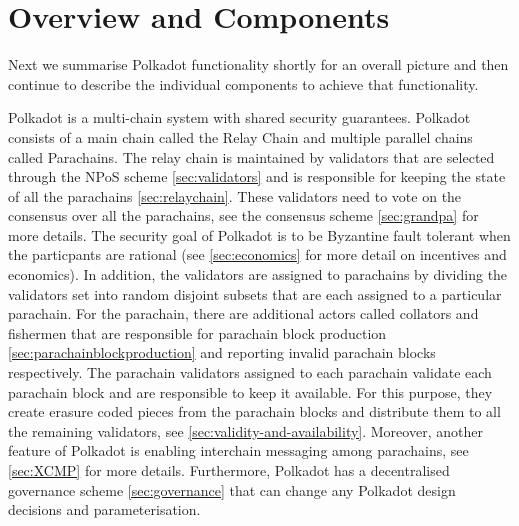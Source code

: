 \section{Overview and Components}\label{sec:components}
Next we summarise Polkadot functionality shortly for an overall picture and then continue to describe the individual components to achieve that functionality.

Polkadot is a multi-chain system with shared security guarantees. Polkadot consists of a main chain called the Relay Chain and multiple parallel chains
called Parachains. The relay chain is maintained by validators that are selected through the NPoS scheme \ref{sec:validators} and is responsible for keeping the state of all the parachains \ref{sec:relaychain}.
These validators need to vote on the consensus over all the parachains, see the consensus scheme \ref{sec:grandpa} for more details.
The security goal of Polkadot is to be Byzantine fault tolerant when the particpants are rational (see \ref{sec:economics} for more detail on incentives and economics).
In addition, the validators are assigned to parachains by dividing the validators set into random disjoint subsets that are each assigned to a particular parachain.
For the parachain, there are additional actors called collators and fishermen that are responsible for parachain block production \ref{sec:parachainblockproduction} and reporting invalid parachain blocks respectively.
The parachain validators assigned to each parachain validate each parachain block and are responsible to keep it available. For this purpose, they create erasure coded pieces from the parachain blocks and distribute
them to all the remaining validators, see \ref{sec:validity-and-availability}. Moreover, another feature of Polkadot is enabling interchain messaging among parachains, see \ref{sec:XCMP} for more details.
Furthermore, Polkadot has a decentralised governance scheme \ref{sec:governance} that can change any Polkadot design decisions and parameterisation.








